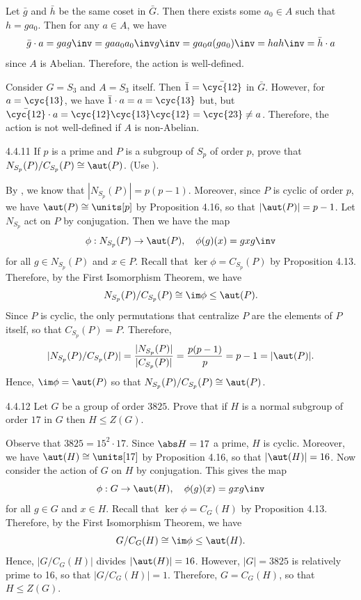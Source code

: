 \begin{sol}
	Let $\bar g$ and $\bar h$ be the same coset in $\bar G$.
	Then there exists some $a_0 \in A$ such that $h = ga_0$.
	Then for any $a \in A$, we have
	\[
		\bar g \cdot a = gag\inv = ga a_0a_0\inv g\inv = ga_0a(ga_0)\inv = hah\inv = \bar h \cdot a
	\]
	since $A$ is Abelian.
	Therefore, the action is well-defined.

	Consider $G = S_3$ and $A = S_3$ itself.
	Then $\bar 1 = \bar{\cyc{1 2}}$ in $\bar G$.
	However, for $a = \cyc{1 3}$, we have $\bar 1 \cdot a = a = \cyc{1 3}$ but, but $\bar{\cyc{1 2}} \cdot a = \cyc{1 2}\cyc{1 3}\cyc{1 2} = \cyc{2 3} \neq a$.
	Therefore, the action is not well-defined if $A$ is non-Abelian.
\end{sol}

\begin{exercise}{4.4.11}
	If $p$ is a prime and $P$ is a subgroup of $S_p$ of order $p$, prove that $N_{S_p}(P)/C_{S_p}(P) \cong \aut(P)$. (Use ).
\end{exercise}

\begin{sol}
	By , we know that $|N_{S_p}(P)| = p(p - 1)$.
	Moreover, since $P$ is cyclic of order $p$, we have $\aut(P) \cong \units[p]$ by Proposition 4.16, so that $|\aut(P)| = p - 1$.
	Let $N_{S_p}$ act on $P$ by conjugation.
	Then we have the map
	\[
		\phi : N_{S_p}(P) \to \aut(P), \quad \phi(g)(x) = gxg\inv
	\]
	for all $g \in N_{S_p}(P)$ and $x \in P$.
	Recall that $\ker\phi = C_{S_p}(P)$ by Proposition 4.13.
	Therefore, by the First Isomorphism Theorem, we have
	\[
		N_{S_p}(P)/C_{S_p}(P) \cong \im\phi \leq \aut(P).
	\]
	Since $P$ is cyclic, the only permutations that centralize $P$ are the elements of $P$ itself, so that $C_{S_p}(P) = P$.
	Therefore,
	\[
		|N_{S_p}(P)/C_{S_p}(P)| = \frac{|N_{S_p}(P)|}{|C_{S_p}(P)|} = \frac{p(p - 1)}{p} = p - 1 = |\aut(P)|.
	\]
	Hence, $\im\phi = \aut(P)$ so that $N_{S_p}(P)/C_{S_p}(P) \cong \aut(P)$.
\end{sol}

\begin{exercise}{4.4.12}
	Let $G$ be a group of order $3825$.
	Prove that if $H$ is a normal subgroup of order $17$ in $G$ then $H \le Z(G)$.
\end{exercise}

\begin{sol}
	Observe that $3825 = 15^2 \cdot 17$.
	Since $\abs H = 17$ a prime, $H$ is cyclic.
	Moreover, we have $\aut(H) \cong \units[17]$ by Proposition 4.16, so that $|\aut(H)| = 16$.
	Now consider the action of $G$ on $H$ by conjugation.
	This gives the map
	\[
		\phi : G \to \aut(H), \quad \phi(g)(x) = gxg\inv
	\]
	for all $g \in G$ and $x \in H$.
	Recall that $\ker\phi = C_G(H)$ by Proposition 4.13.
	Therefore, by the First Isomorphism Theorem, we have
	\[
		G/C_G(H) \cong \im\phi \leq \aut(H).
	\]
	Hence, $|G/C_G(H)|$ divides $|\aut(H)| = 16$.
	However, $|G| = 3825$ is relatively prime to 16, so that $|G/C_G(H)| = 1$.
	Therefore, $G = C_G(H)$, so that $H \leq Z(G)$.
\end{sol}

